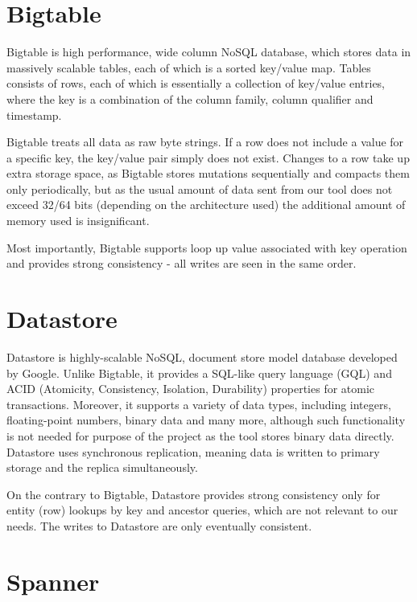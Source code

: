 \documentclass[bsc,frontabs,twoside,singlespacing,parskip,deptreport]{infthesis}     %
\begin{document}

\section{Bigtable}

Bigtable is high performance, wide column NoSQL database, which stores data in massively scalable tables, each of which is a sorted key/value map. Tables consists of rows, each of which is essentially a collection of key/value entries, where the key is a combination of the column family, column qualifier and timestamp. 

Bigtable treats all data as raw byte strings. If a row does not include a value for a specific key, the key/value pair simply does not exist. Changes to a row take up extra storage space, as Bigtable stores mutations sequentially and compacts them only periodically, but as the usual amount of data sent from our tool does not exceed 32/64 bits (depending on the architecture used) the additional amount of memory used is insignificant. 

Most importantly, Bigtable supports loop up value associated with key operation and provides strong consistency - all writes are seen in the same order.

\section{Datastore}

Datastore is highly-scalable NoSQL, document store model database developed by Google. Unlike Bigtable, it provides a SQL-like query language (GQL) and ACID (Atomicity, Consistency, Isolation, Durability) properties for atomic transactions. Moreover, it supports a variety of data types, including integers, floating-point numbers, binary data and many more, although such functionality is not needed for purpose of the project as the tool stores binary data directly. Datastore uses synchronous replication, meaning data is written to primary storage and the replica simultaneously.

On the contrary to Bigtable, Datastore provides strong consistency only for entity (row) lookups by key and ancestor queries, which are not relevant to our needs. The writes to Datastore are only eventually consistent. 

\section{Spanner}
\end{document}
